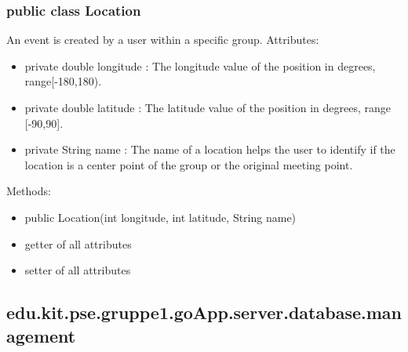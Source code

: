 	\subsubsection{public class Location}
	An event is created by a user within a specific group.
	\newline Attributes:
	\begin{itemize}
	\item private  double longitude : The longitude value of the position in degrees, range[-180,180). 
	\item private  double latitude : The latitude value of the position in degrees, range [-90,90].
	\item private String name : The name of a location helps the user to identify if the location is a center point of the group or the original meeting point.
	\end{itemize}
	Methods:
	\begin{itemize}
	\item public Location(int longitude, int latitude, String name)
	\item getter of all attributes
	\item setter of all attributes
	\end{itemize}


\hypertarget{database.management}{}
	\subsection{edu.kit.pse.gruppe1.goApp.server.database.management}	

